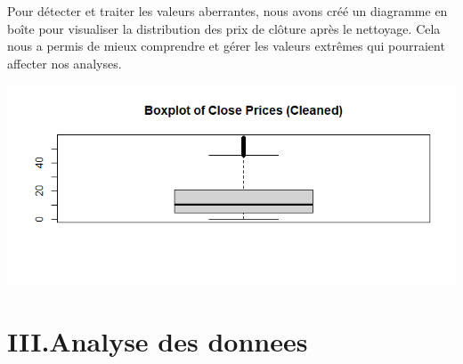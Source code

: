 \documentclass[
  letterpaper,
  DIV=11,
  numbers=noendperiod]{scrartcl}
\begin{document}
\begin{enumerate}
  Pour détecter et traiter les valeurs aberrantes, nous avons créé un
  diagramme en boîte pour visualiser la distribution des prix de clôture
  après le nettoyage. Cela nous a permis de mieux comprendre et gérer
  les valeurs extrêmes qui pourraient affecter nos analyses.

  \includegraphics{images/boxplotClosePriceCleaned.png}
\end{enumerate}

\hypertarget{iii.analyse-des-donnees}{%
\section{III.Analyse des donnees}\label{iii.analyse-des-donnees}}
\end{document}
